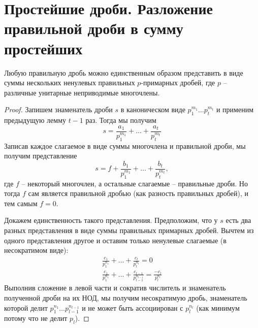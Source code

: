 \section{Простейшие дроби. Разложение правильной дроби в сумму простейших}
\begin{theorem-non}
    Любую правильную дробь можно единственным образом представить в виде суммы нескольких ненулевых правильных $p$-примарных дробей, 
    где $p$ -- различные унитарные неприводимые многочлены.
\end{theorem-non}

\begin{proof}
    Запишем знаменатель дроби $s$ в каноническом виде $p_1^{m_1} \dots p_t^{m_t}$ и применим предыдущую лемму $t - 1$ раз. 
    Тогда мы получим \[ s = \frac{a_1}{p_1^{m_1}} + \dots + \frac{a_t}{p_t^{m_t}} \]
    Записав каждое слагаемое в виде суммы многочлена и правильной дроби, мы получим представление
    \[ s = f + \frac{b_1}{p_1^{m_1}} + \dots + \frac{b_t}{p_t^{m_t}}, \]
    где $f$ -- некоторый многочлен, а остальные слагаемые -- правильные дроби. 
    Но тогда $f$ сам является правильной дробью (как разность правильных дробей), и тем самым $f = 0$.

    Докажем единственность такого представления. 
    Предположим, что у $s$ есть два разных представления в виде суммы правильных примарных дробей. 
    Вычтем из одного представления другое и оставим только ненулевые слагаемые (в несократимом виде):
    \begin{gather*}
        \frac{c_1}{p_1^{n_1}} + \dots + \frac{c_l}{p_l^{n_l}} = 0 \\
        \frac{c_1}{p_1^{n_1}} + \dots + \frac{c_{l - 1}}{p_{l-1}^{n_{l - 1}}} = \frac{-c_l}{p_l^{n_l}}
    \end{gather*}
    Выполнив сложение в левой части и сократив числитель и знаменатель полученной дроби на их НОД, мы получим несократимую дробь,
    знаменатель которой делит $p_1^{n_1} \dots p_{l - 1}^{n_{l - 1}}$ и не может быть ассоциирован с $p_l^{n_l}$ (как минимум потому что не делит $p_l$).
    
\end{proof}